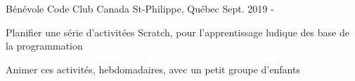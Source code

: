 

\begin{cventries}

  \cventry
    {Bénévole} %
    {Code Club Canada} %
    {St-Philippe, Québec} %
    {Sept. 2019 - } %
    {
      \begin{cvitems} %
        \item {Planifier une série d'activitées Scratch, pour l'apprentissage ludique des base de la programmation}
        \item {Animer ces activités, hebdomadaires, avec un petit groupe d'enfants}
      \end{cvitems}
    }

\end{cventries}

